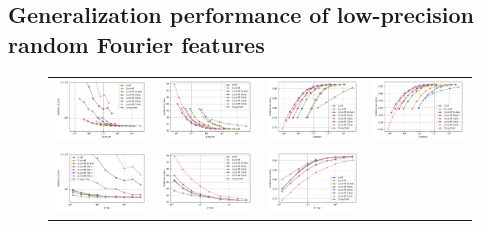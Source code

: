 \subsection{Generalization performance of low-precision random Fourier features}
\begin{figure}
	\centering
	\begin{tabular}{c c c c}
		\includegraphics[width=0.24\linewidth]{figures/census_L2_loss_vs_n_memory.pdf} &
		\includegraphics[width=0.24\linewidth]{figures/yearpred_L2_loss_vs_n_memory.pdf} &
		\includegraphics[width=0.24\linewidth]{figures/covtype_accuracy_vs_n_memory.pdf} &
		\includegraphics[width=0.24\linewidth]{figures/timit_accuracy_vs_n_memory.pdf} \\
		\includegraphics[width=0.24\linewidth]{figures/census_L2_loss_vs_n_feat.pdf} &
		\includegraphics[width=0.24\linewidth]{figures/yearpred_L2_loss_vs_n_feat.pdf} &
		\includegraphics[width=0.24\linewidth]{figures/covtype_accuracy_vs_n_feat.pdf} &

\end{tabular}
\end{figure}
